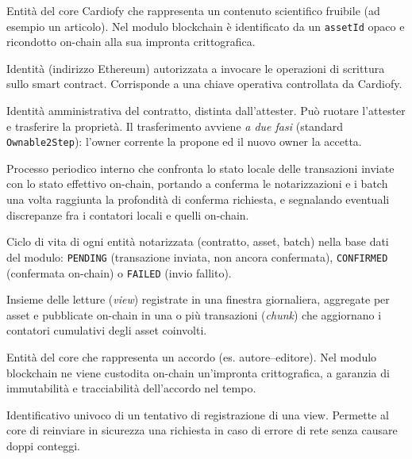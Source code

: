 \documentclass[a4paper,11pt]{article}
\begin{document}
\begin{description}[leftmargin=0pt, itemsep=0.3em, font=\sffamily\bfseries]
\item[Asset] Entit\`a del core Cardiofy che rappresenta un contenuto scientifico fruibile (ad esempio un articolo). Nel modulo blockchain \`e identificato da un \texttt{assetId} opaco e ricondotto on-chain alla sua impronta crittografica.

\item[Attester] Identit\`a (indirizzo Ethereum) autorizzata a invocare le operazioni di scrittura sullo smart contract. Corrisponde a una chiave operativa controllata da Cardiofy.

\item[Owner] Identit\`a amministrativa del contratto, distinta dall'attester. Pu\`o ruotare l'attester e trasferire la propriet\`a. Il trasferimento avviene \emph{a due fasi} (standard \texttt{Ownable2Step}): l'owner corrente la propone ed il nuovo owner la accetta.

\item[Riconciliazione] Processo periodico interno che confronta lo stato locale delle transazioni inviate con lo stato effettivo on-chain, portando a conferma le notarizzazioni e i batch una volta raggiunta la profondit\`a di conferma richiesta, e segnalando eventuali discrepanze fra i contatori locali e quelli on-chain.

\item[Stato on-chain] Ciclo di vita di ogni entit\`a notarizzata (contratto, asset, batch) nella base dati del modulo: \texttt{PENDING} (transazione inviata, non ancora confermata), \texttt{CONFIRMED} (confermata on-chain) o \texttt{FAILED} (invio fallito).

\item[Batch giornaliero] Insieme delle letture (\emph{view}) registrate in una finestra giornaliera, aggregate per asset e pubblicate on-chain in una o pi\`u transazioni (\emph{chunk}) che aggiornano i contatori cumulativi degli asset coinvolti.

\item[Contratto] Entit\`a del core che rappresenta un accordo (es. autore--editore). Nel modulo blockchain ne viene custodita on-chain un'impronta crittografica, a garanzia di immutabilit\`a e tracciabilit\`a dell'accordo nel tempo.

\item[Idempotency key] Identificativo univoco di un tentativo di registrazione di una view. Permette al core di reinviare in sicurezza una richiesta in caso di errore di rete senza causare doppi conteggi.


\end{description}
\end{document}
